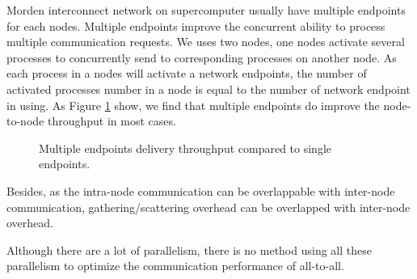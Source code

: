 Morden interconnect network on supercomputer usually have multiple endpoints for each nodes.
Multiple endpoints improve the concurrent ability to process multiple communication requests.
We uses two nodes, one nodes activate several processes to concurrently send to corresponding processes on another node.
As each process in a nodes will activate a network endpoints, the number of activated processes number in a node is equal to the number of network endpoint in using.
As Figure \ref{Multi-port} show, we find that multiple endpoints do improve the node-to-node throughput in most cases.
\begin{figure}[!htb]
  \centering
  \caption{Multiple endpoints delivery throughput compared to single endpoints.}
	\label{Multi-port}
	\vspace{0.2in}
\end{figure}

Besides, as the intra-node communication can be overlappable with inter-node communication, gathering/scattering overhead can be overlapped with inter-node overhead.

Although there are a lot of parallelism, there is no method using all these parallelism to optimize the communication performance of all-to-all.
